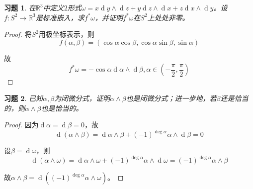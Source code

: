 \documentclass[winfonts,UTF8,c5size,a4paper,fancyhdr,hyperref,titlepage,nocap]{ctexart}
\newtheorem{xiti}{习题}
\theoremstyle{definition}
\theoremstyle{remark}
\numberwithin{equation}{subsection}
\newcommand{\Real}{\mathbb{R}}
\newcommand{\dd}{\operatorname{d}}
\begin{document}
\begin{xiti}
  在$\Real^3$中定义$2$形式$\omega=x\dd y\wedge\dd z+y\dd z\wedge\dd x+z\dd x\wedge\dd y$。设$f\colon S^2\to\Real^3$是标准嵌入，求$f^{\ast}\omega$，并证明$f^{\ast}\omega$在$S^2$上处处非零。
\end{xiti}
\begin{proof}
  将$S^2$用极坐标表示，则
  \begin{equation*}
    f(\alpha,\beta)=(\cos\alpha\cos\beta,\cos\alpha\sin\beta,\sin\alpha)
  \end{equation*}

  故
  \begin{equation*}
    f^{\ast}\omega=-\cos\alpha\dd\alpha\wedge\dd\beta, \alpha\in(-\frac{\pi}{2},\frac{\pi}{2})
  \end{equation*}
\end{proof}

\begin{xiti}
  已知$\alpha,\beta$为闭微分式，证明$\alpha\wedge\beta$也是闭微分式；进一步地，若$\beta$还是恰当的，则$\alpha\wedge\beta$也是恰当的。
\end{xiti}
\begin{proof}
  因为$\dd\alpha=\dd\beta=0$，故
  \begin{equation*}
    \dd(\alpha\wedge\beta)=\dd\alpha\wedge\beta+(-1)^{\deg\alpha}\alpha\wedge\dd\beta=0
  \end{equation*}

  设$\beta=\dd\omega$，则
  \begin{equation*}
    \dd(\alpha\wedge\omega)=\dd\alpha\wedge\omega+(-1)^{\deg\alpha}\alpha\wedge\dd\omega=(-1)^{\deg\alpha}\alpha\wedge\beta
  \end{equation*}

  故$\alpha\wedge\beta=\dd((-1)^{\deg\alpha}\alpha\wedge\omega)$。
\end{proof}
\end{document}
